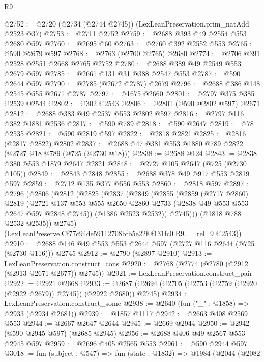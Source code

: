 \begin{lexlean}{R9}
\begin{coremodule}
@2752 := @2720 (@2734 (@2744 @2745)) (LexLeanPreservation.prim_natAdd @2523 @37)
@2753 := @2711 @2752
@2759 := @2688 @393 @49 @2554 @553 @2680 @597
@2760 := @2695 @60
@2763 := @2760 @392 @2552 @553
@2765 := @590 @2679 @597
@2768 := @2763 (@2700 @2765) @2680
@2774 := @2706 @391 @2528 @2551 @2668 @2765 @2752
@2780 := @2688 @389 @49 @2549 @553 @2679 @597
@2785 := @2661 @131 @31 @388 @2547 @553
@2787 := @590 @2644 @597
@2790 := @2785 (@2672 @2787) @2679
@2796 := @2688 @386 @148 @2545 @555 @2671 @2787
@2797 := @1675 @2660
@2801 := @2797 @375 @385 @2539 @2544
@2802 := @302 @2543
@2806 := @2801 (@590 @2802 @597) @2671
@2812 := @2688 @383 @49 @2537 @553 @2802 @597
@2816 := @2797 @116 @382 @1881 @2536
@2817 := @590 @789
@2818 := @590 @2647
@2819 := @78 @2535
@2821 := @590 @2819 @597
@2822 := @2818 @2821
@2825 := @2816 (@2817 @2822) @2802
@2837 := @2688 @47 @381 @553 @1880 @789 @2822 (@2727 @18 @789 (@725 (@2730 @18)))
@2838 := @2688 @124
@2843 := @2838 @380 @553 @1879 @2647 @2821
@2848 := @2727 @105 @2647 (@725 (@2730 @105))
@2849 := @2843 @2848
@2855 := @2688 @378 @49 @917 @553 @2819 @597
@2859 := @2712 @135 @377 @556 @553
@2860 := @2818 @597
@2897 := @2796
    (@2806
      (@2812
        (@2825
          (@2837
            (@2849
              (@2855
                (@2859
                  (@2717 @2860)
                  @2819
                  (@2721
                    @137
                    @553
                    @555
                    @2650
                    @2860
                    @2733
                    (@2838 @49 @553 @553 @2647 @597 @2848 @2745))
                  (@1386 @2523 @2532))
                @2745)))
          (@1818 @788 @2532 @2535))
        @2745)
      (LexLeanPreserve.Cf77c94de59112708bfb5e22f0f131fc0.R9.__rel_9 @2543))
@2910 := @2688 @146 @49 @553 @553 @2644 @597 (@2727 @116 @2644 (@725 (@2730 @116))) @2745
@2912 := @2790 (@2897 @2910)
@2913 := LexLeanPreservation.construct_cons
@2920 := @2768 (@2774 (@2780 (@2912 (@2913 @2671 @2677)) @2745))
@2921 := LexLeanPreservation.construct_pair
@2922 := @2921 @2668
@2933 := @2687 (@2694 (@2705 (@2753 (@2759 (@2920 (@2922 @2679)) @2745)) (@2922 @2680)) @2745)
@2934 := LexLeanPreservation.construct_some
@2938 := @2640 (fun ("_" : @1858) => @2933 (@2934 @2681))
@2939 := @1857 @1117
@2942 := @2663 @408 @2569 @553
@2944 := @2667 @2647 @2644
@2945 := @2669 @2944
@2950 := @2942 (@590 @2945 @597) (@2685 @2945)
@2956 := @2688 @406 @49 @2567 @553 @2945 @597
@2959 := @2696 @405 @2565 @553
@2961 := @590 @2944 @597
@3018 := fun (subject : @547) =>
  fun (state : @1832) =>
  @1984
    (@2044
      (@2082

\end{coremodule}
\end{lexlean}
